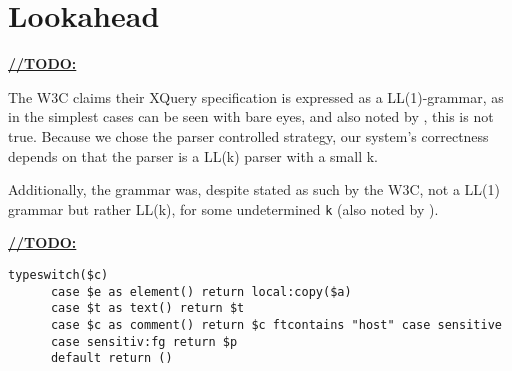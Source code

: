 \section{Lookahead}
\label{sect:discussion:lookahead}
\underline{\textbf{\LARGE //TODO:}}

The W3C claims their XQuery specification is expressed as a LL(1)-grammar\cite{createTokenizer}, as in the simplest cases can be seen with bare eyes, and also noted by \cite{kang_xquery_diglib}, this is not true. Because we chose the parser controlled strategy, our system's correctness depends on that the parser is a LL(k) parser with a small k.

Additionally, the grammar was, despite stated as such
by the W3C, not a LL(1) grammar but rather LL(k), for some undetermined \verb!k!
(also noted by \cite{kang_xquery_diglib}).

\underline{\textbf{\LARGE //TODO:}}
\begin{verbatim}
typeswitch($c) 
      case $e as element() return local:copy($a)
      case $t as text() return $t
      case $c as comment() return $c ftcontains "host" case sensitive
      case sensitiv:fg return $p
      default return ()
\end{verbatim}
